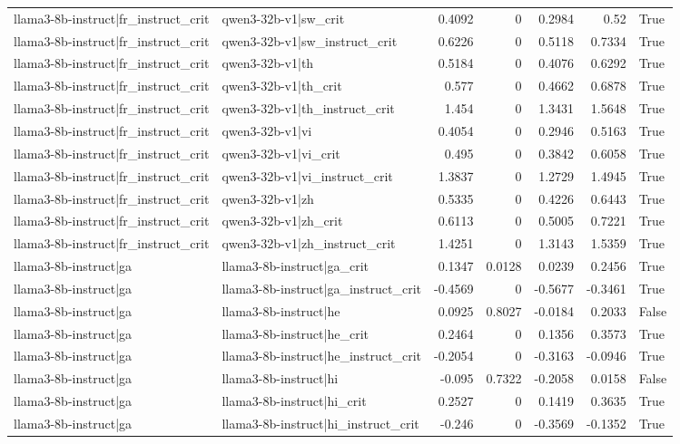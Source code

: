 \begin{table}
\begin{tabular}{l l r r r r l}
llama3-8b-instruct|fr_instruct_crit & qwen3-32b-v1|sw_crit & 0.4092 & 0 & 0.2984 & 0.52 & True \\
llama3-8b-instruct|fr_instruct_crit & qwen3-32b-v1|sw_instruct_crit & 0.6226 & 0 & 0.5118 & 0.7334 & True \\
llama3-8b-instruct|fr_instruct_crit & qwen3-32b-v1|th & 0.5184 & 0 & 0.4076 & 0.6292 & True \\
llama3-8b-instruct|fr_instruct_crit & qwen3-32b-v1|th_crit & 0.577 & 0 & 0.4662 & 0.6878 & True \\
llama3-8b-instruct|fr_instruct_crit & qwen3-32b-v1|th_instruct_crit & 1.454 & 0 & 1.3431 & 1.5648 & True \\
llama3-8b-instruct|fr_instruct_crit & qwen3-32b-v1|vi & 0.4054 & 0 & 0.2946 & 0.5163 & True \\
llama3-8b-instruct|fr_instruct_crit & qwen3-32b-v1|vi_crit & 0.495 & 0 & 0.3842 & 0.6058 & True \\
llama3-8b-instruct|fr_instruct_crit & qwen3-32b-v1|vi_instruct_crit & 1.3837 & 0 & 1.2729 & 1.4945 & True \\
llama3-8b-instruct|fr_instruct_crit & qwen3-32b-v1|zh & 0.5335 & 0 & 0.4226 & 0.6443 & True \\
llama3-8b-instruct|fr_instruct_crit & qwen3-32b-v1|zh_crit & 0.6113 & 0 & 0.5005 & 0.7221 & True \\
llama3-8b-instruct|fr_instruct_crit & qwen3-32b-v1|zh_instruct_crit & 1.4251 & 0 & 1.3143 & 1.5359 & True \\
llama3-8b-instruct|ga & llama3-8b-instruct|ga_crit & 0.1347 & 0.0128 & 0.0239 & 0.2456 & True \\
llama3-8b-instruct|ga & llama3-8b-instruct|ga_instruct_crit & -0.4569 & 0 & -0.5677 & -0.3461 & True \\
llama3-8b-instruct|ga & llama3-8b-instruct|he & 0.0925 & 0.8027 & -0.0184 & 0.2033 & False \\
llama3-8b-instruct|ga & llama3-8b-instruct|he_crit & 0.2464 & 0 & 0.1356 & 0.3573 & True \\
llama3-8b-instruct|ga & llama3-8b-instruct|he_instruct_crit & -0.2054 & 0 & -0.3163 & -0.0946 & True \\
llama3-8b-instruct|ga & llama3-8b-instruct|hi & -0.095 & 0.7322 & -0.2058 & 0.0158 & False \\
llama3-8b-instruct|ga & llama3-8b-instruct|hi_crit & 0.2527 & 0 & 0.1419 & 0.3635 & True \\
llama3-8b-instruct|ga & llama3-8b-instruct|hi_instruct_crit & -0.246 & 0 & -0.3569 & -0.1352 & True \\

\end{tabular}
\end{table}
